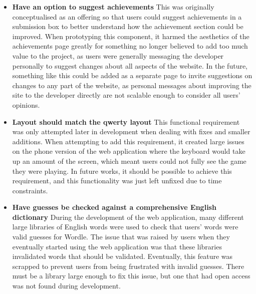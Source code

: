 \begin{itemize}[leftmargin=*, label=\textbullet]
    \item \textbf{Have an option to suggest achievements} This was originally conceptualised as an offering so that users could suggest achievements in a submission box to better understand how the achievement section could be improved. When prototyping this component, it harmed the aesthetics of the achievements page greatly for something no longer believed to add too much value to the project, as users were generally messaging the developer personally to suggest changes about all aspects of the website. In the future, something like this could be added as a separate page to invite suggestions on changes to any part of the website, as personal messages about improving the site to the developer directly are not scalable enough to consider all users' opinions.

    \item \textbf{Layout should match the qwerty layout} This functional requirement was only attempted later in development when dealing with fixes and smaller additions. When attempting to add this requirement, it created large issues on the phone version of the web application where the keyboard would take up an amount of the screen, which meant users could not fully see the game they were playing. In future works, it should be possible to achieve this requirement, and this functionality was just left unfixed due to time constraints.

    \item \textbf{Have guesses be checked against a comprehensive English dictionary}
    During the development of the web application, many different large libraries of English words were used to check that users' words were valid guesses for Wordle. The issue that was raised by users when they eventually started using the web application was that these libraries invalidated words that should be validated. Eventually, this feature was scrapped to prevent users from being frustrated with invalid guesses. There must be a library large enough to fix this issue, but one that had open access was not found during development. 


\end{itemize}